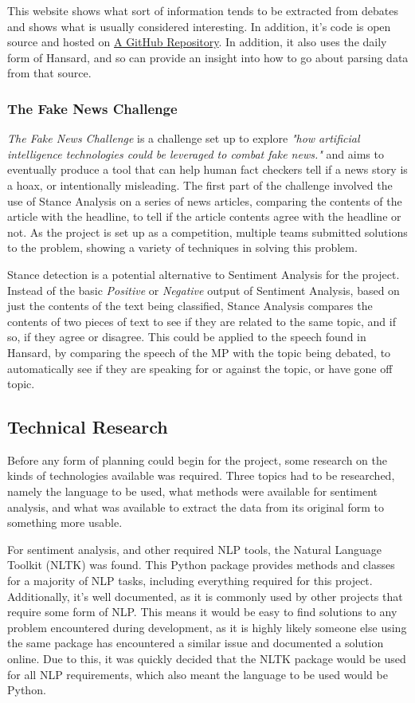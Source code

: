 This website shows what sort of information tends to be extracted from debates and shows what is usually considered interesting. In addition, it's code is open source and hosted on \href{https://github.com/mysociety/theyworkforyou}{A GitHub Repository}. In addition, it also uses the daily form of Hansard, and so can provide an insight into how to go about parsing data from that source.

\subsubsection{The Fake News Challenge}
\emph{The Fake News Challenge}\cite{FakeNewsChallenge2017} is a challenge set up to explore \emph{"how artificial intelligence technologies could be leveraged to combat fake news."} and aims to eventually produce a tool that can help human fact checkers tell if a news story is a hoax, or intentionally misleading. The first part of the challenge involved the use of Stance Analysis on a series of news articles, comparing the contents of the article with the headline, to tell if the article contents agree with the headline or not. As the project is set up as a competition, multiple teams submitted solutions to the problem, showing a variety of techniques in solving this problem.

Stance detection is a potential alternative to Sentiment Analysis for the project. Instead of the basic \emph{Positive} or \emph{Negative} output of Sentiment Analysis, based on just the contents of the text being classified, Stance Analysis compares the contents of two pieces of text to see if they are related to the same topic, and if so, if they agree or disagree. This could be applied to the speech found in Hansard, by comparing the speech of the MP with the topic being debated, to automatically see if they are speaking for or against the topic, or have gone off topic.
\subsection{Technical Research}
\label{sec:bck_tech_research}

Before any form of planning could begin for the project, some research on the kinds of technologies available was required. Three topics had to be researched, namely the language to be used, what methods were available for sentiment analysis, and what was available to extract the data from its original form to something more usable.

For sentiment analysis, and other required NLP tools, the Natural Language Toolkit (NLTK)\cite{Bird2009} was found. This Python package provides methods and classes for a majority of NLP tasks, including everything required for this project. Additionally, it’s well documented, as it is commonly used by other projects that require some form of NLP. This means it would be easy to find solutions to any problem encountered during development, as it is highly likely someone else using the same package has encountered a similar issue and documented a solution online. Due to this, it was quickly decided that the NLTK package would be used for all NLP requirements, which also meant the language to be used would be Python.


